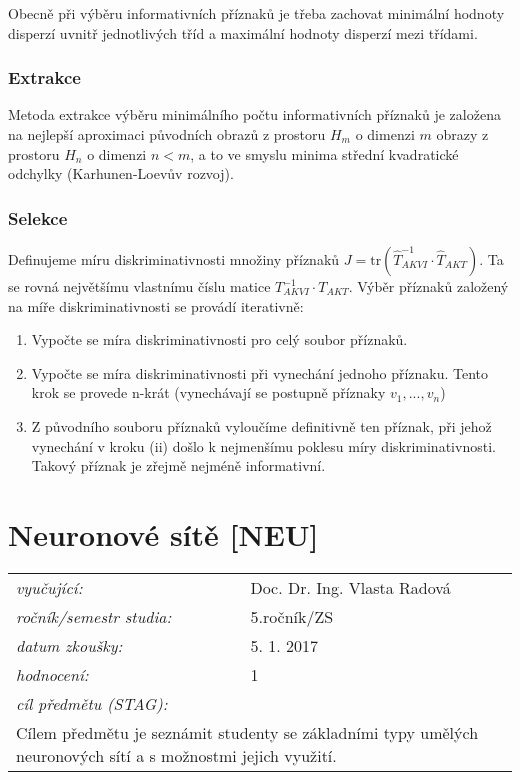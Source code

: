Obecně při výběru informativních příznaků je třeba zachovat minimální hodnoty disperzí uvnitř jednotlivých tříd a maximální hodnoty disperzí mezi třídami.

\subsubsection*{Extrakce}
Metoda extrakce výběru minimálního počtu informativních příznaků je založena na nejlepší aproximaci původních obrazů z prostoru $ H_m $ o dimenzi $ m $ obrazy z prostoru $ H_n $ o dimenzi $ n < m $, a to ve smyslu minima střední kvadratické odchylky (Karhunen-Loevův rozvoj).
\vspace{2cm}

\subsubsection*{Selekce}
Definujeme míru diskriminativnosti množiny příznaků $ J = \mathrm{tr}(\hat{T}_{AKVI}^{-1} \cdot \hat{T}_{AKT}) $. Ta se rovná největšímu vlastnímu číslu matice $ T_{AKVI}^{-1} \cdot T_{AKT} $. Výběr příznaků založený na míře diskriminativnosti se provádí iterativně:
\begin{enumerate}[label=(\roman*)]
\item Vypočte se míra diskriminativnosti pro celý soubor příznaků.
\item Vypočte se míra diskriminativnosti při vynechání jednoho příznaku. Tento krok se provede n-krát (vynechávají se postupně příznaky $ v_1, ..., v_n $)
\item Z původního souboru příznaků vyloučíme definitivně ten příznak, při jehož vynechání v kroku (ii) došlo k nejmenšímu poklesu míry diskriminativnosti. Takový příznak je zřejmě nejméně informativní.
\end{enumerate}
\vspace{2cm}

\section{Neuronové sítě [NEU]}

\begin{table}[H]
\centering
\begin{tabular}{p{4cm} p{12cm}}
\textit{vyučující:}             & Doc. Dr. Ing. Vlasta Radová \\
\textit{ročník/semestr studia:} & 5.ročník/ZS \\
\textit{datum zkoušky:}         & 5. 1. 2017 \\
\textit{hodnocení:}             & 1 \\
\textit{cíl předmětu (STAG):}   & \\
\multicolumn{2}{p{16cm}}{Cílem předmětu je seznámit studenty se základními typy umělých neuronových sítí a s možnostmi jejich využití.}
\end{tabular}
\end{table}

